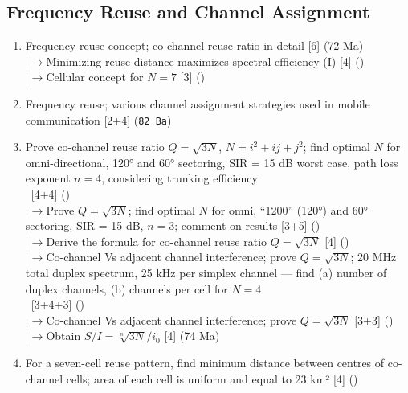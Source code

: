 \documentclass[12pt]{article}
\newcommand{\lb}{\\$\left|\rightarrow\right.$}
\newcommand{\enter}{\\\textcolor{white}{1}}
\begin{document}
  \subsection{Frequency Reuse and Channel Assignment}
    \begin{enumerate}[topsep=0pt, noitemsep]
      \item Frequency reuse concept; co-channel reuse ratio in detail \hfill [6] (72 Ma)
        \lb Minimizing reuse distance maximizes spectral efficiency (I) \hfill [4] ()
        \lb Cellular concept for $N = 7$ \hfill [3] ()
      \item Frequency reuse; various channel assignment strategies used in mobile
        communication \hfill [2+4] (\texttt{82 Ba})
      \item Prove co-channel reuse ratio $Q = \sqrt{3N}$, $N = i^2 + ij + j^2$; find optimal $N$ for
        omni-directional, 120° and 60° sectoring, SIR = 15 dB worst case, path loss exponent
        $n = 4$, considering trunking efficiency
        \enter\hfill [4+4] ()
        \lb Prove $Q = \sqrt{3N}$; find optimal $N$ for omni, ``1200'' (120°) and 60° sectoring,
        SIR = 15 dB, $n = 3$; comment on results \hfill [3+5] ()
        \lb Derive the formula for co-channel reuse ratio $Q = \sqrt{3N}$ \hfill [4] ()
        \lb Co-channel Vs adjacent channel interference; prove $Q = \sqrt{3N}$;
        20 MHz total duplex spectrum, 25 kHz per simplex channel --- find
        (a) number of duplex channels, (b) channels per cell for $N = 4$
        \enter\hfill [3+4+3] ()
        \lb Co-channel Vs adjacent channel interference; prove $Q = \sqrt{3N}$ \hfill [3+3] ()
        \lb Obtain $S/I = \sqrt[n]{3N}/i_0$ \hfill [4] (74 Ma)
      \item For a seven-cell reuse pattern, find minimum distance between centres of
        co-channel cells; area of each cell is uniform and equal to 23 km² \hfill [4] ()
    \end{enumerate}
\end{document}
